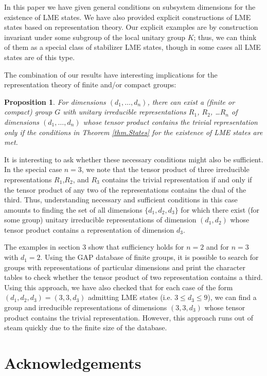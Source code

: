 \documentclass[12pt]{article}
\newtheorem{proposition}[theorem]{Proposition}
\theoremstyle{definition}
\begin{document}
In this paper we have given general conditions on subsystem dimensions for the existence of LME states. We have also provided explicit constructions of LME states based on representation theory. Our explicit examples are by construction invariant under some subgroup of the local unitary group $K$; thus, we can think of them as a special class of stabilizer LME states, though in some cases all LME states are of this type.

The combination of our results have interesting implications for the representation theory of finite and/or compact groups:
\begin{proposition}
For dimensions $(d_1, \dots, d_n)$, there can exist a (finite or compact) group $G$ with unitary irreducible representations $R_1$, $R_2$, \dots $R_n$  of dimensions $(d_1, \dots, d_n)$ whose tensor product contains the trivial representation only if the conditions in Theorem \ref{thm.States} for the existence of LME states are met.
\end{proposition}
It is interesting to ask whether these necessary conditions might also be sufficient. In the special case $n=3$, we note that the tensor product of three irreducible representations $R_1$,$R_2$, and $R_3$ contains the trivial representation if and only if the tensor product of any two of the representations contains the dual of the third. Thus, understanding necessary and sufficient conditions in this case amounts to finding the set of all dimensions $\{d_1, d_2, d_3\}$ for which there exist (for some group) unitary irreducible representations  of dimension $(d_1,d_2)$ whose tensor product contains a representation of dimension $d_3$.

The examples in section 3 show that sufficiency holds for $n=2$ and for $n=3$ with $d_1 = 2$. Using the GAP database of finite groups, it is possible to search for groups with representations of particular dimensions and print the character tables to check whether the tensor product of two representation contains a third. Using this approach, we have also checked that for each case of the form $(d_1,d_2,d_3) = (3,3,d_3)$ admitting LME states (i.e. $3 \le d_3 \le 9$), we can find a group and irreducible representations of dimensions $(3,3,d_3)$ whose tensor product contains the trivial representation. However, this approach runs out of steam quickly due to the finite size of the database.

\section*{Acknowledgements}
\end{document}
